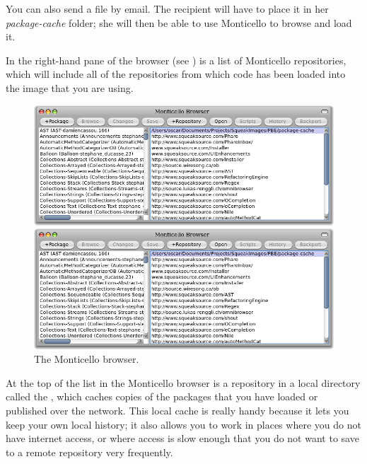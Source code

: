 \documentclass[a4paper,10pt,twoside]{book}
\begin{document}
You can also send a  file by email. 
The recipient will have to place it in her \emph{package-cache} folder; she will then be able to use Monticello to browse and load it. 

In the right-hand pane of the browser (see ) is a list of Monticello repositories, which will include all of the repositories from which code has been loaded into the image that you are using.  

\begin{figure}[hbt]
\ifluluelse
	{\centerline {\includegraphics[width=\textwidth]{MonticelloBrowser}}}
	{\centerline {\includegraphics[scale=0.7]{MonticelloBrowser}}}
\caption{The Monticello browser.
\label{fig:monticello1}}
\end{figure}

At the top of the list in the Monticello browser is a repository in a local directory called the , which caches copies of the packages that you have loaded or published over the network. This local cache is really handy because it lets you keep your own local history; it also allows you to work in places where you do not have internet access, or where access is slow enough that you do not want to save to a remote repository very frequently.
\end{document}
